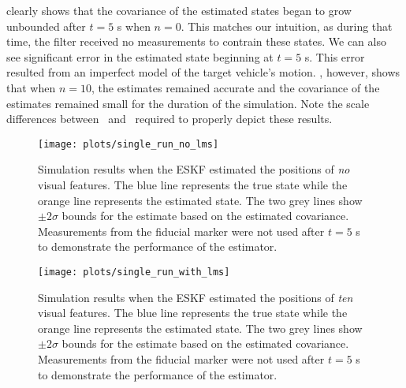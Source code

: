  clearly shows that the covariance
of the estimated
states began to grow unbounded after $t = 5$ s when $n = 0$.
This matches our intuition, as during that time, the filter received no measurements to contrain
these states.
We can also see significant error in the estimated state beginning at $t = 5$ s.
This error resulted from an imperfect model of the target vehicle's motion.
, however, shows that when $n = 10$,
the estimates remained accurate and the covariance of the estimates remained
small for the duration of the simulation.
Note the scale differences between~ and~
required to properly depict these results.

\begin{figure}
  \centering
  \texttt{[image: plots/single\_run\_no\_lms]}
  \caption[ESKF Simulation Results Using No Visual Features]{Simulation results when the ESKF estimated the positions of \emph{no} visual
  features. The blue line represents the true state while the orange line
  represents the estimated state. The two grey lines show $\pm 2 \sigma$ bounds for
  the estimate based on the estimated covariance. Measurements from the fiducial
  marker were not used after $t = 5$ s
  to demonstrate the performance of the estimator.}
  \label{fig:no_lms}
\end{figure}

\begin{figure}
  \centering
  \texttt{[image: plots/single\_run\_with\_lms]}
  \caption[ESKF Simulation Results Using Ten Visual Features]{Simulation results
    when the ESKF estimated the positions of \emph{ten} visual
  features. The blue line represents the true state while the orange line
  represents the estimated state. The two grey lines show $\pm 2 \sigma$ bounds for
  the estimate based on the estimated covariance. Measurements from the fiducial
  marker were not used after $t = 5$ s
  to demonstrate the performance of the estimator.}
  \label{fig:with_lms}
\end{figure}


